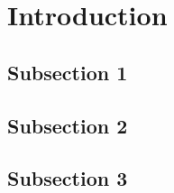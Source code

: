 

\section{Introduction}
\lipsum[1]
\subsection{Subsection 1}
\lipsum[1]
\subsection{Subsection 2}
\lipsum[1]
\subsection{Subsection 3}
\lipsum[1]
